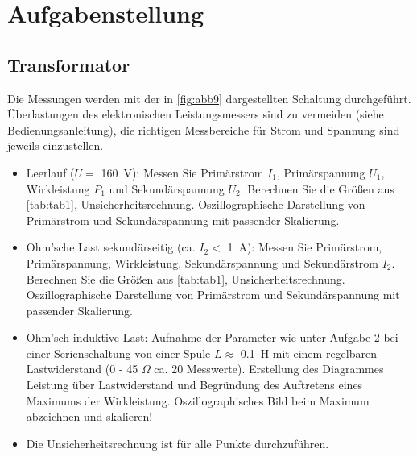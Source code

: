 \documentclass[11pt,ngerman]{scrartcl}
\begin{document}

\tableofcontents
\newpage

\section{Aufgabenstellung\label{Auf0}\cite{vorlagetrafo}}

\subsection{Transformator}

Die Messungen werden mit der in \autoref{fig:abb9} dargestellten Schaltung durchgeführt. Überlastungen
des elektronischen Leistungsmessers sind zu vermeiden (siehe Bedienungsanleitung), die richtigen
Messbereiche für Strom und Spannung sind jeweils einzustellen.\cite{vorlagetrafo}

\begin{itemize}

	\item Leerlauf ($U =$ \SI{160}{V}): Messen Sie Primärstrom $I_1$, Primärspannung $U_1$, Wirkleistung $P_1$
	      und Sekundärspannung $U_2$. Berechnen Sie die Größen aus \autoref{tab:tab1}, Unsicherheitsrechnung.
	      Oszillographische Darstellung von Primärstrom und Sekundärspannung mit passender Skalierung.

	\item Ohm’sche Last sekundärseitig (ca. $I_2 <$ \SI{1}{A}): Messen Sie Primärstrom, Primärspannung,
	      Wirkleistung, Sekundärspannung und Sekundärstrom $I_2$. Berechnen Sie die Größen aus
	      \autoref{tab:tab1}, Unsicherheitsrechnung. Oszillographische Darstellung von Primärstrom und Sekundärspannung mit passender Skalierung.

	\item Ohm’sch-induktive Last: Aufnahme der Parameter wie unter Aufgabe 2 bei einer Serienschaltung
	      von einer Spule $L \approx$ \SI{0.1}{H} mit einem regelbaren Lastwiderstand (0 - 45 $\Omega$ ca. 20
	      Messwerte). Erstellung des Diagrammes Leistung über Lastwiderstand und Begründung
	      des Auftretens eines Maximums der Wirkleistung. Oszillographisches Bild beim Maximum
	      abzeichnen und skalieren!

	\item Die Unsicherheitsrechnung ist für alle Punkte durchzuführen.

\end{itemize}
\end{document}
